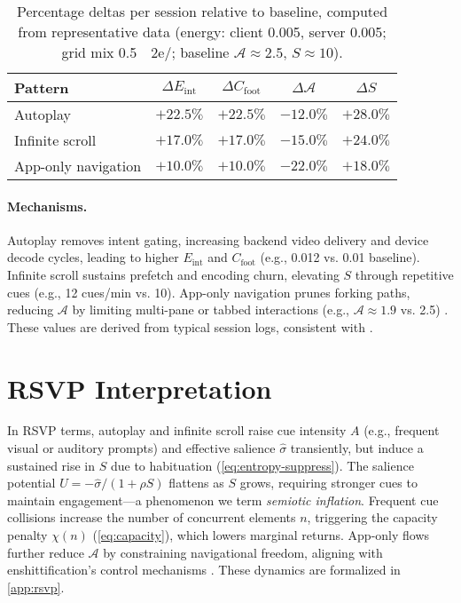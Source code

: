 \documentclass[openany]{book}
\newcommand{\Sent}{S} %
\newcommand{\Eint}{E_{\mathrm{int}}} %
\newcommand{\Cfoot}{C_{\mathrm{foot}}} %
\newcommand{\Auton}{\mathcal{A}} %
\newcommand{\kWh}{\mathrm{kWh}}
\begin{document}
\begin{table}[h]
\centering
\begin{tabular}{lcccc}
\hline
\textbf{Pattern} & $\Delta \Eint$ & $\Delta \Cfoot$ & $\Delta \Auton$ & $\Delta \Sent$ \\
\hline
Autoplay & $+22.5\%$ & $+22.5\%$ & $-12.0\%$ & $+28.0\%$ \\
Infinite scroll & $+17.0\%$ & $+17.0\%$ & $-15.0\%$ & $+24.0\%$ \\
App-only navigation & $+10.0\%$ & $+10.0\%$ & $-22.0\%$ & $+18.0\%$ \\
\hline
\end{tabular}
\caption{Percentage deltas per session relative to baseline, computed from representative data (energy: client \SI{0.005}{\kWh}, server \SI{0.005}{\kWh}; grid mix \SI{0.5}{\kgCO2e/\kWh}; baseline $\Auton \approx 2.5$, $\Sent \approx 10$).}
\label{tab:deltas}
\end{table}

\paragraph{Mechanisms.}
Autoplay removes intent gating, increasing backend video delivery and device decode cycles, leading to higher $\Eint$ and $\Cfoot$ (e.g., \SI{0.012}{\kWh} vs. \SI{0.01}{\kWh} baseline). Infinite scroll sustains prefetch and encoding churn, elevating $\Sent$ through repetitive cues (e.g., 12 cues/min vs. 10). App-only navigation prunes forking paths, reducing $\Auton$ by limiting multi-pane or tabbed interactions (e.g., $\Auton \approx 1.9$ vs. 2.5) \citep{doctorow2022}. These values are derived from typical session logs, consistent with \citet{extentia2024}.

\section{RSVP Interpretation}
\label{sec:hidden-rsvp}
In RSVP terms, autoplay and infinite scroll raise cue intensity $A$ (e.g., frequent visual or auditory prompts) and effective salience $\widehat{\sigma}$ transiently, but induce a sustained rise in $\Sent$ due to habituation (\cref{eq:entropy-suppress}). The salience potential $U=-\widehat{\sigma}/(1+\rho \Sent)$ flattens as $\Sent$ grows, requiring stronger cues to maintain engagement—a phenomenon we term \emph{semiotic inflation}. Frequent cue collisions increase the number of concurrent elements $n$, triggering the capacity penalty $\chi(n)$ (\cref{eq:capacity}), which lowers marginal returns. App-only flows further reduce $\Auton$ by constraining navigational freedom, aligning with enshittification’s control mechanisms \citep{doctorow2022}. These dynamics are formalized in \cref{app:rsvp}.
\end{document}
